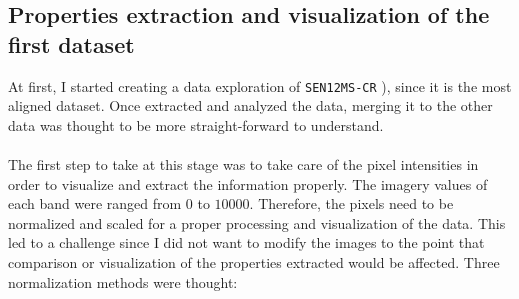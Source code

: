 \documentclass[11pt, a4paper]{article}
\begin{document}
	\subsection{Properties extraction and visualization of the first dataset}
	At first, I started creating a data exploration of \texttt{SEN12MS-CR} \cite{sen12mscr}), since it is the most aligned dataset. Once extracted and analyzed the data, merging it to the other data was thought to be more straight-forward to understand.
	\\\\
	The first step to take at this stage was to take care of the pixel intensities in order to visualize and extract the information properly. The imagery values of each band were ranged from $0$ to $10000$. Therefore, the pixels need to be normalized and scaled for a proper processing and visualization of the data. This led to a challenge since I did not want to modify the images to the point that comparison or visualization of the properties extracted would be affected. Three normalization methods were thought:
\end{document}
